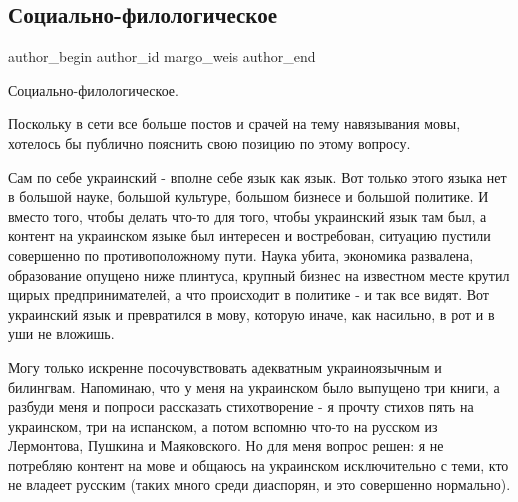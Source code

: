  
 
 
 
 
 
\subsection{Социально-филологическое}
\label{sec:26_07_2021.fb.margo_weis.1.socialno_filologicheskoje}
 
\ifcmt
 author_begin
   author_id margo_weis
 author_end
\fi

Социально-филологическое.

Поскольку в сети все больше постов и срачей на тему навязывания мовы, хотелось
бы публично пояснить свою позицию по этому вопросу. 

Сам по себе украинский - вполне себе язык как язык. Вот только этого языка нет
в большой науке, большой культуре, большом бизнесе и большой политике. И вместо
того, чтобы делать что-то для того, чтобы украинский язык там был, а контент на
украинском языке был интересен и востребован, ситуацию пустили совершенно по
противоположному пути. Наука убита, экономика развалена, образование опущено
ниже плинтуса, крупный бизнес на известном месте крутил щирых предпринимателей,
а что происходит в политике - и так все видят. Вот украинский язык и
превратился в мову, которую иначе, как насильно, в рот и в уши не вложишь.

Могу только искренне посочувствовать адекватным украиноязычным и билингвам.
Напоминаю, что у меня на украинском было выпущено три книги, а разбуди меня и
попроси рассказать стихотворение - я прочту стихов пять на украинском, три на
испанском, а потом вспомню что-то на русском из Лермонтова, Пушкина и
Маяковского. Но для меня вопрос решен: я не потребляю контент на мове и общаюсь
на украинском исключительно с теми, кто не владеет русским (таких много среди
диаспорян, и это совершенно нормально).

